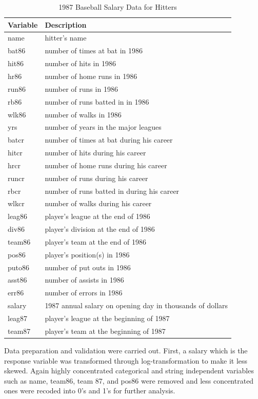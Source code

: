 \vspace{0.1in}
\begin{table}[H]
	\caption{1987 Baseball Salary Data for Hitters}
	\vspace{0.1in}
	\centering
	\begin{tabular}{|p{3cm}|p{11cm}|}
		\hline
		Variable  &Description\\
		\hline
		name &	hitter's name\\
		bat86&  number of times at bat in 1986\\
		hit86&  number of hits in 1986\\
		hr86&  number of home runs in 1986\\
		run86&   number of runs in 1986\\
		rb86&  number of runs batted in in 1986\\
		wlk86& number of walks in 1986\\
		yrs&  number of years in the major leagues\\
		batcr&    number of times at bat during his career\\
		hitcr&  number of hits during his career\\
		hrcr&   number of home runs during his career\\
		runcr&    number of runs during his career\\
		rbcr&    number of runs batted in during his career\\
		wlkcr&    number of walks during his career\\
		leag86&    player's league at the end of 1986\\
		div86&    player's division at the end of 1986\\
		team86&    player's team at the end of 1986\\
		pos86 &   player's position(s) in 1986\\
		puto86 &    number of put outs in 1986\\
		asst86 &  number of assists in 1986\\
		err86 &  number of errors in 1986\\
		salary  &  1987 annual salary on opening day in thousands of  dollars\\
		leag87  &  player's league at the beginning of 1987\\
		team87  &  player's team at the beginning of 1987\\
		\hline
	\end{tabular}
	\label{table:Data}
\end{table}
Data preparation and validation were carried out. First, a salary which is the response variable was transformed through log-transformation to make it less skewed. Again highly concentrated categorical and string independent variables such as name, team86, team 87, and pos86  were removed and less concentrated ones were recoded into 0's and 1's for further analysis.


